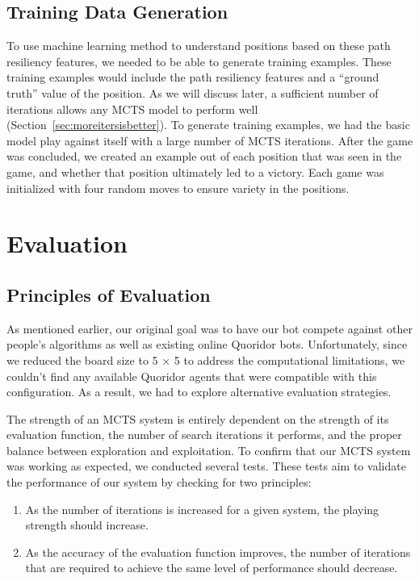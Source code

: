 \documentclass[10pt]{article}
\begin{document}
\subsection{Training Data Generation}

To use machine learning method to understand positions based on these path resiliency features, we needed to be able to generate training examples. These training examples would include the path resiliency features and a ``ground truth'' value of the position. As we will discuss later, a sufficient number of iterations allows any MCTS model to perform well (Section~\ref{sec:moreitersisbetter}). To generate training examples, we had the basic model play against itself with a large number of MCTS iterations. After the game was concluded, we created an example out of each position that was seen in the game, and whether that position ultimately led to a victory. Each game was initialized with four random moves to ensure variety in the positions. 


\section{Evaluation}

\subsection{Principles of Evaluation}

As mentioned earlier, our original goal was to have our bot compete against other people's algorithms as well as existing online Quoridor bots. Unfortunately, since we reduced the board size to 5 × 5 to address the computational limitations, we couldn't find any available Quoridor agents that were compatible with this configuration. As a result, we had to explore alternative evaluation strategies.

The strength of an MCTS system is entirely dependent on the strength of its evaluation function, the number of search iterations it performs, and the proper balance between exploration and exploitation. To confirm that our MCTS system was working as expected, we conducted several tests. These tests aim to validate the performance of our system by checking for two principles:

\begin{enumerate}
    \item As the number of iterations is increased for a given system, the playing strength should increase.
    \item As the accuracy of the evaluation function improves, the number of iterations that are required to achieve the same level of performance should decrease.
\end{enumerate}
\end{document}

